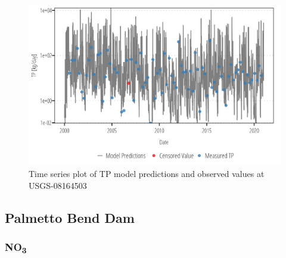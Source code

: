 \documentclass[
]{article}
\begin{document}
\begin{figure}[h]

{\centering \includegraphics{model_assessment_files/figure-pdf/unnamed-chunk-61-1.png}

}

\caption{Time series plot of TP model predictions and observed values at
USGS-08164503}

\end{figure}

\clearpage

\hypertarget{palmetto-bend-dam}{%
\subsection{Palmetto Bend Dam}\label{palmetto-bend-dam}}

\hypertarget{no3-4}{%
\subsubsection{\texorpdfstring{NO\textsubscript{3}}{NO3}}\label{no3-4}}
\end{document}
